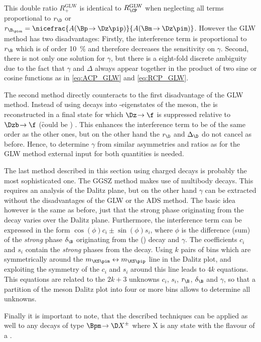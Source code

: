 This double ratio $R_{+}^{\text{GLW}}$ is identical to $R_{\CP}^{\text{GLW}}$ when neglecting all terms proportional to $r_\D$ or $r_{\B_\pion}=\nicefrac{A\!\left(\Bp\!\to\Dz\pip\right)}{A\!\left(\Bm\!\to\Dz\pim\right)}$.
However the GLW method has two disadvantages: Firstly, the interference term is proportional to $r_\B$ which is of order \SI{10}{\percent} and therefore decreases the sensitivity on $\gamma$.
Second, there is not only one solution for $\gamma$, but there is a eight-fold discrete ambiguity due to the fact that $\gamma$ and $\Delta$ always appear together in the product of two sine or cosine functions as in \cref{eq:ACP_GLW} and \cref{eq:RCP_GLW}.

The second method directly counteracts to the first disadvantage of the GLW method.
Instead of using decays into \CP-eigenstates of the \D meson, the \D is reconstructed in a final state for which $\Dz\!\to\f$ is suppressed relative to $\Dzb\!\to\f$ (\eg \f could be \Km\pip) \cite{ADS}.
This enhances the interference term to be of the same order as the other ones, but on the other hand the $r_\D$ and $\Delta_\D$ do not cancel as before.
Hence, to determine $\gamma$ from similar asymmetries and ratios as for the GLW method external input for both quantities is needed.

The last method described in this section using charged \B decays is probably the most sophisticated one.
The GGSZ method makes use of multibody \D decays.
This requires an analysis of the Dalitz plane, but on the other hand $\gamma$ can be extracted without the disadvantages of the GLW or the ADS method.
The basic idea however is the same as before, just that the strong phase originating from the \D decay varies over the Dalitz plane.
Furthermore, the interference term can be expressed in the form $\cos\!\left(\phi\right)c_i\pm\sin\!\left(\phi\right)s_i$, where $\phi$ is the difference (sum) of the \emph{strong} phase $\delta_\B$ originating from the \Bm (\Bp) decay and $\gamma$.
The coefficients $c_i$ and $s_i$ contain the \emph{strong} phases from the \D decay.
Using $k$ pairs of bins which are symmetrically around the $m_{\KS\pim}\leftrightarrow m_{\KS\pip}$ line in the Dalitz plot, and exploiting the symmetry of the $c_i$ and $s_i$ around this line leads to $4k$ equations.
This equations are related to the $2k+3$ unknowns $c_i$, $s_i$, $r_\B$, $\delta_\B$ and $\gamma$, so that a partition of the \D meson Dalitz plot into four or more bins allows to determine all unknowns.

Finally it is important to note, that the described techniques can be applied as well to any decays of type $\Bpm\!\to\D X^{\pm}$ where X is any state with the flavour of a \Kpm.

